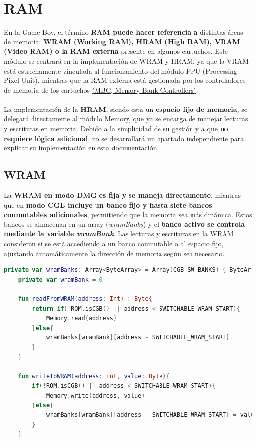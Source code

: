 \section{RAM}

En la Game Boy, el término \textbf{RAM puede hacer referencia a} distintas áreas de memoria: \textbf{WRAM (Working RAM), HRAM (High RAM), VRAM (Video RAM) o la RAM externa} presente en algunos cartuchos. Este módulo se centrará en la implementación de WRAM y HRAM, ya que la VRAM está estrechamente vinculada al funcionamiento del módulo PPU (Processing Pixel Unit), mientras que la RAM externa está gestionada por los controladores de memoria de los cartuchos \hyperref[history_mbcs]{(MBC, Memory Bank Controllers)}.
\\\\
La implementación de la \textbf{HRAM}, siendo esta un \textbf{espacio fijo de memoria}, se delegará directamente al módulo Memory, que ya se encarga de manejar lecturas y escrituras en memoria. Debido a la simplicidad de su gestión y a que \textbf{no requiere lógica adicional}, no se desarrollará un apartado independiente para explicar su implementación en esta documentación.

\subsection{WRAM}
La \textbf{WRAM en modo DMG es fija y se maneja directamente}, mientras que en \textbf{modo CGB incluye un banco fijo y hasta siete bancos conmutables adicionales}, permitiendo que la memoria sea más dinámica. Estos bancos se almacenan en un array (\textit{wramBanks}) y el \textbf{banco activo se controla mediante la variable \textit{wramBank}}. Las lecturas y escrituras en la WRAM consideran si se está accediendo a un banco conmutable o al espacio fijo, ajustando automáticamente la dirección de memoria según sea necesario.

\begin{lstlisting}[language=Kotlin, caption={Lectura y escritura en Work RAM.}, label={code:wramreadwrite}]
    private var wramBanks: Array<ByteArray> = Array(CGB_SW_BANKS) { ByteArray(ECHO_RAM_START - SWITCHABLE_WRAM_START) } // Not used if not in CGB mode
    private var wramBank = 0

    fun readFromWRAM(address: Int) : Byte{
        return if(!ROM.isCGB() || address < SWITCHABLE_WRAM_START){
            Memory.read(address)
        }else{
            wramBanks[wramBank][address - SWITCHABLE_WRAM_START]
        }
    }

    fun writeToWRAM(address: Int, value: Byte){
        if(!ROM.isCGB() || address < SWITCHABLE_WRAM_START){
            Memory.write(address, value)
        }else{
            wramBanks[wramBank][address - SWITCHABLE_WRAM_START] = value
        }
    }
\end{lstlisting}


